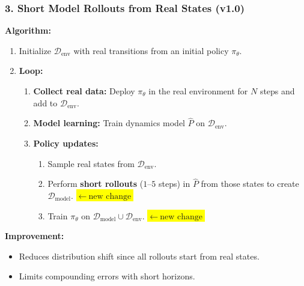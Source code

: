 \documentclass[12pt]{article}
\begin{document}
\subsubsection*{3. Short Model Rollouts from Real States (v1.0)}
\textbf{Algorithm:}
\begin{enumerate}
    \item Initialize $\mathcal{D}_{\text{env}}$ with real transitions from an initial policy $\pi_\theta$.
    \item \textbf{Loop:}
    \begin{enumerate}
        \item \textbf{Collect real data:} Deploy $\pi_\theta$ in the real environment for $N$ steps and add to $\mathcal{D}_{\text{env}}$.
        \item \textbf{Model learning:} Train dynamics model $\hat{P}$ on $\mathcal{D}_{\text{env}}$.
        \item \textbf{Policy updates:}
        \begin{enumerate}
            \item Sample real states from $\mathcal{D}_{\text{env}}$.
            \item Perform \textbf{short rollouts} ($1$--$5$ steps) in $\hat{P}$ from those states to create $\mathcal{D}_{\text{model}}$. \colorbox{yellow}{\(\leftarrow\ \text{new change}\)}
            \item Train $\pi_\theta$ on $\mathcal{D}_{\text{model}} \cup \mathcal{D}_{\text{env}}$. \colorbox{yellow}{\(\leftarrow\ \text{new change}\)}
        \end{enumerate}
    \end{enumerate}
\end{enumerate}


\textbf{Improvement:}
\begin{itemize}
    \item Reduces distribution shift since all rollouts start from real states.
    \item Limits compounding errors with short horizons.
\end{itemize}
\end{document}
